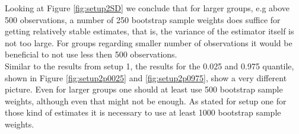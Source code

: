 \documentclass{scrartcl}\usepackage[]{graphicx}\usepackage[]{color}
\begin{document}
Looking at Figure \ref{fig:setup2SD} we conclude that for larger groups, e.g above 500 observations, a number of 250 bootstrap sample weights does suffice for getting relatively stable estimates, that is, the variance of the estimator itself is not too large. For groups regarding smaller number of observations it would be beneficial to not use less then 500 observations.\\
Similar to the results from setup 1, the results for the 0.025 and 0.975 quantile, shown in Figure \ref{fig:setup2p0025} and \ref{fig:setup2p0975}, show a very different picture. Even for larger groups one should at least use 500 bootstrap sample weights, although even that might not be enough. As stated for setup one for those kind of estimates it is necessary to use at least 1000 bootstrap sample weights.

\newpage

\end{document}
